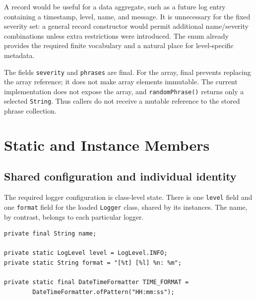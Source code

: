 \documentclass[12pt,a4paper]{article}
\newcommand{\code}[1]{\texttt{#1}}
\begin{document}
A record would be useful for a data aggregate, such as a future log entry containing a timestamp, level, name, and message. It is unnecessary for the fixed severity set: a general record constructor would permit additional name/severity combinations unless extra restrictions were introduced. The enum already provides the required finite vocabulary and a natural place for level-specific metadata.

The fields \code{severity} and \code{phrases} are final. For the array, final prevents replacing the array reference; it does not make array elements immutable. The current implementation does not expose the array, and \code{randomPhrase()} returns only a selected \code{String}. Thus callers do not receive a mutable reference to the stored phrase collection.

\section{Static and Instance Members}
\subsection{Shared configuration and individual identity}
The required logger configuration is class-level state. There is one \code{level} field and one \code{format} field for the loaded \code{Logger} class, shared by its instances. The name, by contrast, belongs to each particular logger.

\begin{samepage}
\begin{lstlisting}
private final String name;

private static LogLevel level = LogLevel.INFO;
private static String format = "[%t] [%l] %n: %m";

private static final DateTimeFormatter TIME_FORMAT =
        DateTimeFormatter.ofPattern("HH:mm:ss");
\end{lstlisting}
\end{samepage}
\end{document}
